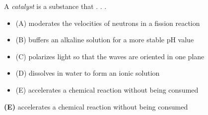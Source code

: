 

A {\it catalyst} is a substance that . . .

\begin{itemize}
\item{(A)} moderates the velocities of neutrons in a fission reaction
\vskip 5pt 
\item{(B)} buffers an alkaline solution for a more stable pH value
\vskip 5pt 
\item{(C)} polarizes light so that the waves are oriented in one plane
\vskip 5pt 
\item{(D)} dissolves in water to form an ionic solution
\vskip 5pt 
\item{(E)} accelerates a chemical reaction without being consumed
\end{itemize}







{\bf (E)} accelerates a chemical reaction without being consumed
 










